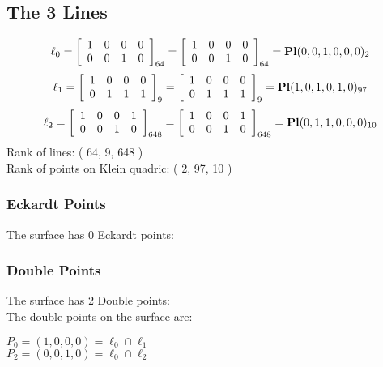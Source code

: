 \documentclass{article}
\begin{document}
{\subsection*{The 3 Lines}
$$
\ell_{0} = 
\left[
\begin{array}{*{4}{r}}
1 & 0 & 0 & 0\\
0 & 0 & 1 & 0\\
\end{array}
\right]
_{64}
=
\left[
\begin{array}{*{4}c}
1  & 0  & 0  & 0\\
0  & 0  & 1  & 0\\
\end{array}
\right]_{64}
={\rm\bf Pl}(0,0,1,0,0,0 )_{2}$$
$$
\ell_{1} = 
\left[
\begin{array}{*{4}{r}}
1 & 0 & 0 & 0\\
0 & 1 & 1 & 1\\
\end{array}
\right]
_{9}
=
\left[
\begin{array}{*{4}c}
1  & 0  & 0  & 0\\
0  & 1  & 1  & 1\\
\end{array}
\right]_{9}
={\rm\bf Pl}(1,0,1,0,1,0 )_{97}$$
$$
\ell_{2} = 
\left[
\begin{array}{*{4}{r}}
1 & 0 & 0 & 1\\
0 & 0 & 1 & 0\\
\end{array}
\right]
_{648}
=
\left[
\begin{array}{*{4}c}
1  & 0  & 0  & 1\\
0  & 0  & 1  & 0\\
\end{array}
\right]_{648}
={\rm\bf Pl}(0,1,1,0,0,0 )_{10}$$
Rank of lines: ( 64, 9, 648 )\\
Rank of points on Klein quadric: ( 2, 97, 10 )\\
\subsubsection*{Eckardt Points}
The surface has 0 Eckardt points:\\
\subsubsection*{Double Points}
The surface has 2 Double points:\\
The double points on the surface are:\\
\begin{multicols}{2}
\noindent
$P_{0} = ( 1, 0, 0, 0 ) = \ell_{0} \cap \ell_{1} $\\
$P_{2} = ( 0, 0, 1, 0 ) = \ell_{0} \cap \ell_{2} $\\
\end{multicols}
}
\end{document}
